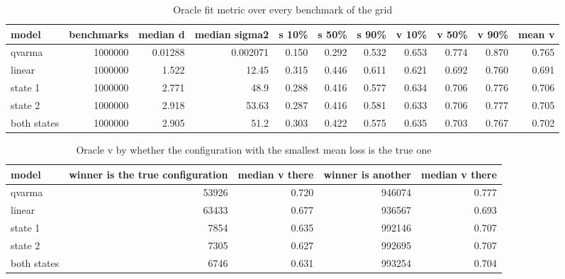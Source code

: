 \begin{table}[htbp]
\centering
\caption{Oracle fit metric over every benchmark of the grid}
\label{tab:fit_metric_oracle}
\begin{tabular}{lrrrrrrrrrr}
\hline
model & benchmarks & median d & median sigma2 & s 10\% & s 50\% & s 90\% & v 10\% & v 50\% & v 90\% & mean v \\
\hline
qvarma & 1000000 & 0.01288 & 0.002071 & 0.150 & 0.292 & 0.532 & 0.653 & 0.774 & 0.870 & 0.765 \\
linear & 1000000 & 1.522 & 12.45 & 0.315 & 0.446 & 0.611 & 0.621 & 0.692 & 0.760 & 0.691 \\
state 1 & 1000000 & 2.771 & 48.9 & 0.288 & 0.416 & 0.577 & 0.634 & 0.706 & 0.776 & 0.706 \\
state 2 & 1000000 & 2.918 & 53.63 & 0.287 & 0.416 & 0.581 & 0.633 & 0.706 & 0.777 & 0.705 \\
both states & 1000000 & 2.905 & 51.2 & 0.303 & 0.422 & 0.575 & 0.635 & 0.703 & 0.767 & 0.702 \\
\hline
\end{tabular}
\end{table}

\begin{table}[htbp]
\centering
\caption{Oracle v by whether the configuration with the smallest mean loss is the true one}
\label{tab:fit_metric_winner}
\begin{tabular}{lrrrr}
\hline
model & winner is the true configuration & median v there & winner is another & median v there \\
\hline
qvarma & 53926 & 0.720 & 946074 & 0.777 \\
linear & 63433 & 0.677 & 936567 & 0.693 \\
state 1 & 7854 & 0.635 & 992146 & 0.707 \\
state 2 & 7305 & 0.627 & 992695 & 0.707 \\
both states & 6746 & 0.631 & 993254 & 0.704 \\
\hline
\end{tabular}
\end{table}

